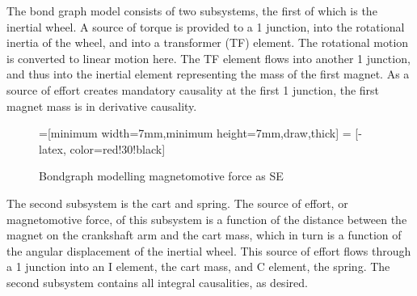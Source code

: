 \documentclass[notitlepage,10pt]{report}
\begin{document}
\begin{multicols}{2}
The bond graph model consists of two subsystems, the first of which is the inertial wheel. A source of torque is provided to a 1 junction, into the rotational inertia of the wheel, and into a transformer (TF) element. The rotational motion is converted to linear motion here. The TF element flows into another 1 junction, and thus into the inertial element representing the mass of the first magnet. As a source of effort creates mandatory causality at the first 1 junction, the first magnet mass is in derivative causality. 
\begin{figure}
   \centering
   =[minimum width=7mm,minimum height=7mm,draw,thick]
    = [-latex, color=red!30!black]
    \caption{Bondgraph modelling magnetomotive force as SE}
    \label{fig:bondgraph1}
\end{figure}
The second subsystem is the cart and spring. The source of effort, or magnetomotive force, of this subsystem is a function of the distance between the magnet on the crankshaft arm and the cart mass, which in turn is a function of the angular displacement of the inertial wheel. This source of effort flows through a 1 junction into an I element, the cart mass, and C element, the spring. The second subsystem contains all integral causalities, as desired. 


\end{multicols}
\end{document}
